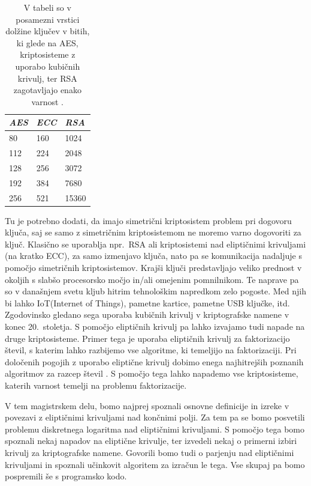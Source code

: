 \documentclass[12pt,a4paper,twoside]{article}
\theoremstyle{definition} %
\theoremstyle{plain} %
\numberwithin{equation}{section}  %
\begin{document}
\begin{table}[h]
\centering
\begin{tabular}{|l|l|l|}
\hline
\textit{\textbf{AES}} & \textit{\textbf{ECC}} & \textit{\textbf{RSA}} \\ \hline
80                    & 160                   & 1024                  \\ \hline
112                   & 224                   & 2048                  \\ \hline
128                   & 256                   & 3072                  \\ \hline
192                   & 384                   & 7680                  \\ \hline
256                   & 521                   & 15360                 \\ \hline
\end{tabular}
 \caption[Primerjava kriptosistemov.]{V tabeli so v posamezni vrstici dolžine ključev v bitih, ki glede na AES, kriptosisteme z uporabo kubičnih krivulj, ter RSA zagotavljajo enako varnost \cite{NIST}.}
\end{table}
Tu je potrebno dodati, da imajo simetrični kriptosistem problem pri dogovoru ključa, saj se samo z simetričnim kriptosistemom ne moremo varno dogovoriti za ključ. Klasično se uporablja npr.\ RSA ali kriptosistemi nad eliptičnimi krivuljami (na kratko ECC),  za samo izmenjavo ključa, nato pa se komunikacija nadaljuje s pomočjo simetričnih kriptosistemov. Krajši ključi predstavljajo veliko prednost v okoljih s slabšo procesorsko močjo in/ali omejenim pomnilnikom. Te naprave pa so v današnjem svetu kljub hitrim tehnološkim napredkom zelo pogoste. Med njih bi lahko IoT(Internet of Things), pametne kartice, pametne USB ključke, itd. Zgodovinsko gledano sega uporaba kubičnih krivulj v kriptografske namene v konec 20.\ stoletja. S pomočjo eliptičnih krivulj pa lahko izvajamo tudi napade na druge kriptosisteme. Primer tega je uporaba eliptičnih krivulj za faktorizacijo števil, s katerim lahko razbijemo vse algoritme, ki temeljijo na faktorizaciji.  Pri določenih pogojih z uporabo eliptične krivulj dobimo enega najhitrejših poznanih algoritmov za razcep števil \cite{Lenstra1987}. S pomočjo tega lahko napademo vse kriptosisteme, katerih varnost temelji na problemu faktorizacije.

V tem magistrskem delu, bomo najprej spoznali osnovne definicije in izreke v povezavi z eliptičnimi krivuljami nad končnimi polji. Za tem pa se bomo posvetili problemu diskretnega logaritma nad eliptičnimi krivuljami. S pomočjo tega bomo spoznali nekaj napadov na eliptične krivulje, ter izvedeli nekaj o primerni izbiri krivulj za kriptografske namene. Govorili bomo tudi o parjenju nad eliptičnimi krivuljami in spoznali učinkovit algoritem za izračun le tega. Vse skupaj pa bomo pospremili še s programsko kodo.
\end{document}
